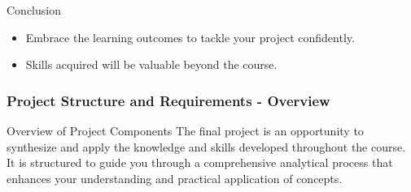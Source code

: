 \documentclass[aspectratio=169]{beamer}
\begin{document}
\begin{frame}[fragile]{Conclusion}
    \begin{itemize}
        \item Embrace the learning outcomes to tackle your project confidently.
        \item Skills acquired will be valuable beyond the course.
    \end{itemize}
\end{frame}

\begin{frame}[fragile]
    \frametitle{Project Structure and Requirements - Overview}
    \begin{block}{Overview of Project Components}
        The final project is an opportunity to synthesize and apply the knowledge and skills developed throughout the course. 
        It is structured to guide you through a comprehensive analytical process that enhances your understanding and practical application of concepts.
    \end{block}
\end{frame}
\end{document}
